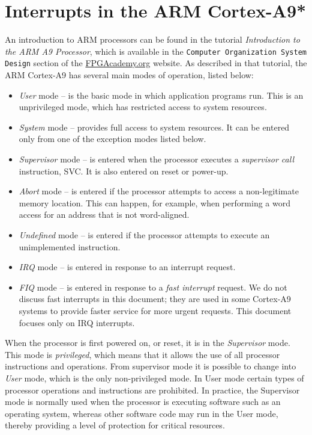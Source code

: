 \documentclass[11pt, twoside, pdftex]{article}
\begin{document}
\section{Interrupts in the ARM Cortex-A9*}
An introduction to ARM processors can be found in the tutorial {\it Introduction to the
ARM A9 Processor},  which is available 
in the \texttt{Computer Organization System Design} section of the 
{\small \href{https://www.fpgacademy.org/tutorials.html} {FPGAcademy.org}} website.
As described in that tutorial, the ARM Cortex-A9 has several main modes of 
operation, listed below:
\begin{itemize}
\item {\it User} mode -- is the basic mode in which application
programs run. This is an unprivileged mode, which has restricted
access to system resources.
\item {\it System} mode -- provides full access to system
resources. It can be entered only from one of the exception
modes listed below.
\item {\it Supervisor} mode -- is entered when the processor executes
a {\it supervisor call} instruction, SVC. It is also entered on reset or power-up.
\item {\it Abort} mode -- is entered if the processor attempts to access a non-legitimate memory
		  location. This can happen, for example, when performing a word access for
		  an address that is not word-aligned.
\item {\it Undefined} mode -- is entered if the processor
attempts to execute an unimplemented instruction.
\item {\it IRQ} mode -- is entered in response to an interrupt request.
\item {\it FIQ} mode -- is entered in response to a {\it fast interrupt} request. We do not 
discuss fast interrupts in this document; they are used in some Cortex-A9 systems to 
provide faster service for more urgent requests. This document focuses only on IRQ interrupts.
\end{itemize}

When the processor is first powered on, or reset, it is in the {\it Supervisor}
mode. This mode is {\it privileged}, which means that it allows the use of all processor
instructions and operations. From supervisor mode it is possible to 
change into {\it User} mode, which is the only non-privileged mode. In User mode certain types
of processor operations and instructions are prohibited. In practice, the Supervisor mode is 
normally used when the processor is executing software such as an operating system,
whereas other software code may run in the User mode, thereby providing a level of protection 
for critical resources.
\end{document}
